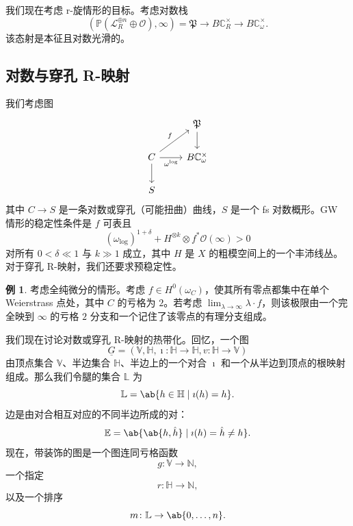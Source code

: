 \documentclass{amsart}
\theoremstyle{definition}
\newtheorem{exm}[thm]{例}
\theoremstyle{remark}
\theoremstyle{plain}
\theoremstyle{definition}
\theoremstyle{remark}
\newcommand{\N}{\mathbb{N}}
\newcommand{\C}{\mathbb{C}}
\newcommand{\E}{\mathbb{E}}
\newcommand{\V}{\mathbb{V}}
\renewcommand{\H}{\mathbb{H}}
\renewcommand{\L}{\mathbb{L}}
\renewcommand{\P}{\mathbb{P}}
\newcommand{\mc}[1]{\mathcal{#1}}
\newcommand{\mf}[1]{\mathfrak{#1}}
\newcommand{\ul}[1]{\underline{#1}}
\newcommand{\1}{\mathbf{1}}
\newcommand{\2}{\mathbf{2}}
\newcommand{\3}{\mathbf{3}}
\begin{document}
我们现在考虑 r-旋情形的目标。考虑对数栈
\[ (\P(\mc{L}_R^{\oplus n} \oplus \mc{O}), \infty) = \mf{P} \to B \C_R^{\times} \to B \C_{\omega}^{\times}. \]
该态射是本征且对数光滑的。

\subsection{对数与穿孔 R-映射}%
\label{sub:Log and punctured R-maps}

我们考虑图
\begin{equation*}
\begin{tikzcd}
    & \mf{P} \ar{d} \\
    C \ar{ur}{f} \ar{r}[swap]{\omega^{\log}} \ar{d} & B \C_{\omega}^{\times} \\
    S
\end{tikzcd}
\end{equation*}
其中 \(C \to S\) 是一条对数或穿孔（可能扭曲）曲线，\(S\) 是一个 fs 对数概形。GW 情形的稳定性条件是 \(f\) 可表且
\[ (\omega_{\log})^{1+\delta} + H^{\otimes k} \otimes f^* \mc{O}(\infty) > 0 \]
对所有 \(0 < \delta \ll 1\) 与 \(k \gg 1\) 成立，其中 \(H\) 是 \(X\) 的粗模空间上的一个丰沛线丛。对于穿孔 R-映射，我们还要求预稳定性。

\begin{exm}
    考虑全纯微分的情形。考虑 \(f \in H^0(\omega_C)\)，使其所有零点都集中在单个 Weierstrass 点处，其中 \(C\) 的亏格为 \(2\)。若考虑 \(\lim_{\lambda \to \infty} \lambda \cdot f\)，则该极限由一个完全映到 \(\infty\) 的亏格 \(2\) 分支和一个记住了该零点的有理分支组成。
\end{exm}

我们现在讨论对数或穿孔 R-映射的热带化。回忆，一个图
\[ \ul{G} = (\V, \H, \imath \colon \H \to \H, v \colon \H \to \V) \]
由顶点集合 \(\V\)、半边集合 \(\H\)、半边上的一个对合 \(\imath\) 和一个从半边到顶点的根映射组成。那么我们令腿的集合 \(\L\) 为
\[ \L = \ab\{ h \in \H \mid \imath(h) = h\}. \]
边是由对合相互对应的不同半边所成的对：
\[ \E = \ab\{ \ab\{h, \hat{h}\} \mid \imath(h) = \hat{h} \neq h \}. \]
现在，带装饰的图是一个图连同亏格函数
\[ g \colon \V \to \N, \]
一个指定
\[ r \colon \H \to \N, \]
以及一个排序
\[ m \colon \L \to \ab\{0, \ldots, n\}. \]
\end{document}
